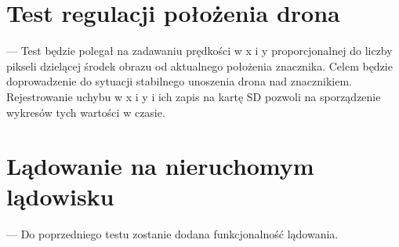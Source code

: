 \section{Test regulacji położenia drona}
\label{sec:Test regulacji położenia drona}
--- Test będzie polegał na zadawaniu prędkości w x i y proporcjonalnej do liczby pikseli dzielącej środek obrazu od aktualnego położenia znacznika. Celem będzie doprowadzenie do sytuacji stabilnego unoszenia drona nad znacznikiem. Rejestrowanie uchybu w x i y i ich zapis na kartę SD pozwoli na sporządzenie wykresów tych wartości w czasie.
\section{Lądowanie na nieruchomym lądowisku}
\label{sec:Lądowanie na nieruchomym lądowisku}
--- Do poprzedniego testu zostanie dodana funkcjonalność lądowania.
